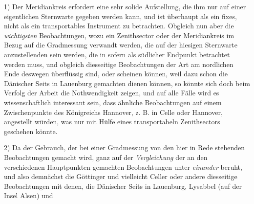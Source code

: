 1) Der Meridiankreis erfordert eine sehr solide Aufstellung, die ihm nur auf einer eigentlichen Sternwarte gegeben werden kann, und ist überhaupt als ein fixes, nicht als ein transportables Instrument zu betrachten. Obgleich nun aber die \textit{wichtigsten} Beobachtungen, wozu ein Zenithsector oder der Meridiankreis im Bezug auf die Gradmessung verwandt werden, die auf der hiesigen Sternwarte anzustellenden sein werden, die in sofern als südlicher Endpunkt betrachtet werden muss, und obgleich diesseitige Beobachtungen der Art am nordlichen Ende deswegen überflüssig sind, oder scheinen können, weil dazu schon die Dänischer Seits in Lauenburg gemachten dienen können, so könnte sich doch beim Verfolg der Arbeit die Nothwendigkeit zeigen, und auf alle Fälle wird es wissenschaftlich interessant sein, dass ähnliche Beobachtungen auf einem Zwischenpunkte des Königreichs Hannover, z. B. in Celle oder Hannover, angestellt würden, was nur mit Hülfe eines transportabeln Zenithsectors geschehen könnte.

2) Da der Gebrauch, der bei einer Gradmessung von den hier in Rede stehenden Beobachtungen gemacht wird, ganz auf der \textit{Vergleichung} der an den verschiedenen Hauptpunkten gemachten Beobachtungen unter \textit{einander} beruht, und also demnächst die Göttinger und vielleicht Celler oder andere diesseitige Beobachtungen mit denen, die Dänischer Seits in Lauenburg, Lysabbel (auf der Insel Alsen) und
